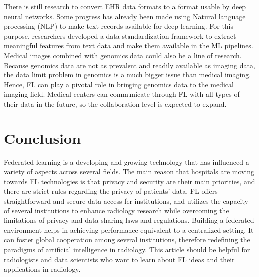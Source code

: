 There is still research to convert EHR data formats to a format usable by deep neural networks. Some progress has already been made using Natural language processing (NLP) to make text records available for deep learning\cite{dreisbach2019systematic}. For this purpose, researchers developed a data standardization framework to extract meaningful features from text data and make them available in the ML pipelines.  Medical images combined with genomics data could also be a line of research. Because genomics data are not as prevalent and readily available as imaging data, the data limit problem in genomics is a much bigger issue than medical imaging. Hence, FL can play a pivotal role in bringing genomics data to the medical imaging field. Medical centers can communicate through FL with all types of their data in the future, so the collaboration level is expected to expand.
\\


\section{Conclusion}
   Federated learning is a developing and growing technology that has influenced a variety of aspects across several fields. 
The main reason that hospitals are moving towards FL technologies is that privacy and security are their main priorities, and there are strict rules regarding the privacy of patients' data. FL offers straightforward and secure data access for institutions, and utilizes the capacity of several institutions to enhance radiology research while overcoming the limitations of privacy and data sharing laws and regulations. Building a federated environment helps in achieving performance equivalent to a centralized setting. It can foster global cooperation among several institutions, therefore redefining the paradigms of artificial intelligence in radiology. 
This article should be helpful for radiologists and data scientists who want to learn about FL ideas and their applications in radiology. 

